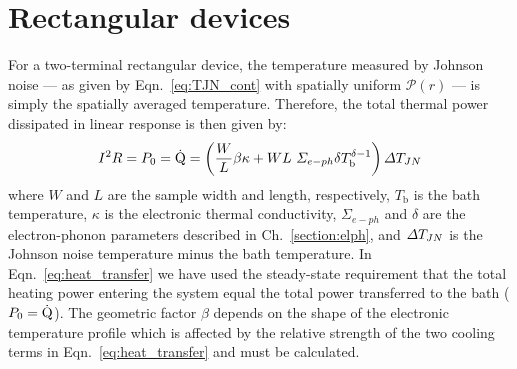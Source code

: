 \section{Rectangular devices}\label{section:retangularDeviceJN}
For a two-terminal rectangular device, the temperature measured by Johnson noise --- as given by Eqn.~\ref{eq:TJN_cont} with spatially uniform $\mathcal{P}(r)$ --- is simply the spatially averaged temperature. Therefore, the total thermal power dissipated in linear response is then given by:
\begin{equation}\label{eq:heat_transfer}
I^2R=P_0=\dot{\mathrm{Q}} = \left(\frac{W}{L}\beta\kappa + WL~\Sigma_{e-ph}\delta T_\mathrm{b}^{\delta-1}\right)\Delta T_{JN}
\end{equation}
where $W$ and $L$ are the sample width and length, respectively, $T_\mathrm{b}$ is the bath temperature, $\kappa$ is the electronic thermal conductivity, $\Sigma_{e-ph}$ and $\delta$ are the electron-phonon parameters described in Ch.~\ref{section:elph}, and $\Delta T_{JN}$ is the Johnson noise temperature minus the bath temperature. In Eqn.~\ref{eq:heat_transfer} we have used the steady-state requirement that the total heating power entering the system equal the total power transferred to the bath ($P_0=\dot{\mathrm{Q}}$). The geometric factor $\beta$ depends on the shape of the electronic temperature profile which is affected by the relative strength of the two cooling terms in Eqn.~\ref{eq:heat_transfer} and must be calculated.

